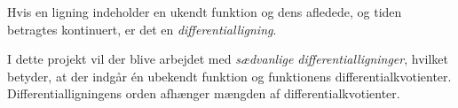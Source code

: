 Hvis en ligning indeholder en ukendt funktion og dens afledede, og tiden betragtes kontinuert, er det en \textit{differentialligning}.

I dette projekt vil der blive arbejdet med \textit{sædvanlige differentialligninger}, hvilket betyder, at der indgår én ubekendt funktion og funktionens differentialkvotienter. Differentialligningens orden afhænger mængden af differentialkvotienter. 





